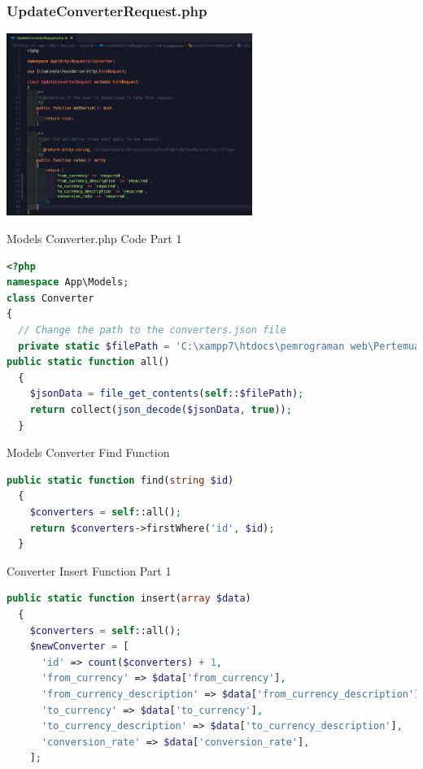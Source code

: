 \documentclass[aspectratio=169, table]{beamer}
\begin{document}
\begin{frame}[fragile]
 \frametitle{UpdateConverterRequest.php}
 \vskip1cm
 \begin{center}
  \includegraphics[width=0.6\textwidth]{classFiles/pertemuan-10-request-part-2.png}
 \end{center}
\end{frame}

\begin{frame}[fragile]{Models Converter.php Code Part 1}
\vskip1cm
\begin{lstlisting}[language=PHP]
	<?php
namespace App\Models;
class Converter
{
  // Change the path to the converters.json file
  private static $filePath = 'C:\xampp7\htdocs\pemrograman web\Pertemuan 10\app\Models\converters.json';
public static function all()
  {
    $jsonData = file_get_contents(self::$filePath);
    return collect(json_decode($jsonData, true));
  }
\end{lstlisting}
\end{frame}

\begin{frame}[fragile]{Models Converter Find Function}
\vskip1cm
\begin{lstlisting}[language=PHP]
public static function find(string $id)
  {
    $converters = self::all();
    return $converters->firstWhere('id', $id);
  }
\end{lstlisting}
\end{frame}

\begin{frame}[fragile]{Converter Insert Function Part 1}
\vskip1cm
\begin{lstlisting}[language=PHP]
public static function insert(array $data)
  {
    $converters = self::all();
    $newConverter = [
      'id' => count($converters) + 1,
      'from_currency' => $data['from_currency'],
      'from_currency_description' => $data['from_currency_description'],
      'to_currency' => $data['to_currency'],
      'to_currency_description' => $data['to_currency_description'],
      'conversion_rate' => $data['conversion_rate'],
    ];
\end{lstlisting}
\end{frame}
\end{document}
